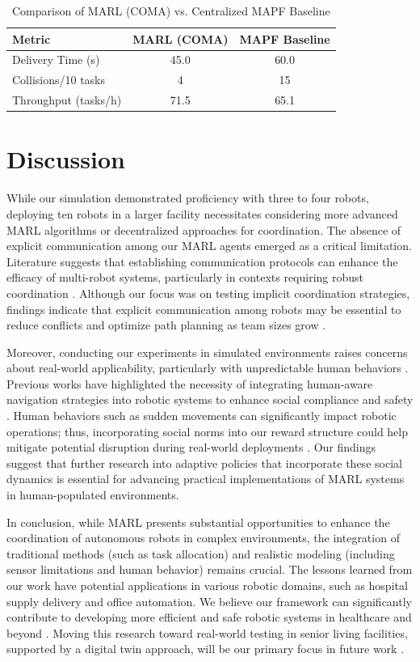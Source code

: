 \documentclass[conference]{IEEEtran}
\begin{document}
\begin{table}[h]
\caption{Comparison of MARL (COMA) vs. Centralized MAPF Baseline}
\label{tab:comparison}
\begin{tabular}{|l|c|c|}
\hline
\textbf{Metric} & \textbf{MARL (COMA)} & \textbf{MAPF Baseline} \\
\hline
Delivery Time (s) & 45.0 & 60.0 \\
Collisions/10 tasks & 4 & 15 \\
Throughput (tasks/h) & 71.5 & 65.1 \\
\hline
\end{tabular}
\end{table}

\section{Discussion}
\label{sec:discussion}
While our simulation demonstrated proficiency with three to four robots, deploying ten robots in a larger facility necessitates considering more advanced MARL algorithms or decentralized approaches for coordination. The absence of explicit communication among our MARL agents emerged as a critical limitation. Literature suggests that establishing communication protocols can enhance the efficacy of multi-robot systems, particularly in contexts requiring robust coordination \citep{ztouni2021, ivanovic2019}. Although our focus was on testing implicit coordination strategies, findings indicate that explicit communication among robots may be essential to reduce conflicts and optimize path planning as team sizes grow \citep{liu2023}.

Moreover, conducting our experiments in simulated environments raises concerns about real-world applicability, particularly with unpredictable human behaviors \citep{liu2023, yang2022}. Previous works have highlighted the necessity of integrating human-aware navigation strategies into robotic systems to enhance social compliance and safety \citep{rostumi2019, yang2022}. Human behaviors such as sudden movements can significantly impact robotic operations; thus, incorporating social norms into our reward structure could help mitigate potential disruption during real-world deployments \citep{yang2022, rostumi2019}. Our findings suggest that further research into adaptive policies that incorporate these social dynamics is essential for advancing practical implementations of MARL systems in human-populated environments.

In conclusion, while MARL presents substantial opportunities to enhance the coordination of autonomous robots in complex environments, the integration of traditional methods (such as task allocation) and realistic modeling (including sensor limitations and human behavior) remains crucial. The lessons learned from our work have potential applications in various robotic domains, such as hospital supply delivery and office automation. We believe our framework can significantly contribute to developing more efficient and safe robotic systems in healthcare and beyond \citep{ivanovic2019, schreiders2021}. Moving this research toward real-world testing in senior living facilities, supported by a digital twin approach, will be our primary focus in future work \citep{yoo2023, yoo2023a}.
\end{document}
